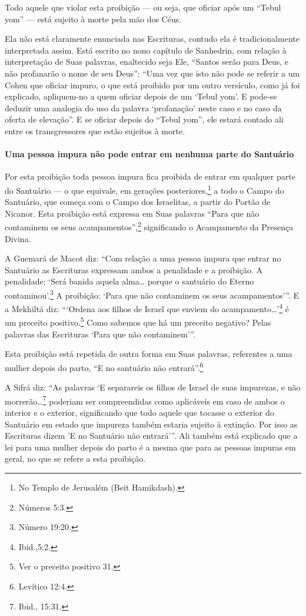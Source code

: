 Todo aquele que violar esta proibição --- ou seja, que oficiar após um
``Tebul yom'' --- está sujeito à morte pela mão dos Céus.

Ela não está claramente enunciada nas Escrituras, contudo ela é
tradicionalmente interpretada assim. Está escrito no nono capítulo de
Sanhedrin, com relação à interpretação de Suas palavras, enaltecido seja
Ele, ``Santos serão para Deus, e não profanarão o nome de seu Deus'': ``Uma vez que isto não
pode se referir a um Cohen que oficiar impuro, o que está proibido
por um outro versículo, como já foi explicado, apliquem-no a quem
oficiar depois de um `Tebul yom'. E pode-se deduzir uma analogia do uso
da palavra `profanação' neste caso e no caso da oferta de elevação''. E
se oficiar depois do ``Tebul yom'', ele estará contado ali entre os
transgressores que estão sujeitos à morte.

\paragraph{Uma pessoa impura não pode entrar em nenhuma parte do Santuário}

Por esta proibição toda pessoa impura fica proibida de entrar em
qualquer parte do Santuário --- o que equivale, em gerações
posteriores,\footnote{No Templo de Jerusalém (Beit Hamikdash).} a todo o Campo do Santuário, que
começa com o Campo dos Israelitas, a partir do Portão de Nicanor. Esta
proibição está expressa em Suas palavras ``Para que não contaminem os
seus acampamentos'',\footnote{Números 5:3.} significando o Acampamento da
Presença Divina.

A Guemará de Macot diz: ``Com relação a uma pessoa impura que entrar no
Santuário as Escrituras expressam ambos a penalidade e a proibição. A
penalidade: `Será banida aquela alma\ldots{} porque o santuário do Eterno
contaminou'.\footnote{Número 19:20.} A proibição: `Para que não contaminem os
seus acampamentos'''. E a Mekhiltá diz: ```Ordena aos filhos de Israel
que enviem do acampamento\ldots{}'\footnote{Ibid.,5:2.} é um preceito
positivo.\footnote{Ver o preceito positivo 31.} Como sabemos que há um preceito
negativo? Pelas palavras das Escrituras `Para que não contaminem'''.

Esta proibição está repetida de outra forma em Suas palavras, referentes
a uma mulher depois do parto, ``E no santuário não entrará''.\footnote{Levítico
12:4.}

A Sifrá diz: ``As palavras `E separareis os filhos de Israel de suas
impurezas, e não morrerão\ldots{}\footnote{Ibid., 15:31.} poderiam ser compreendidas
como aplicáveis em caso de ambos o interior e o exterior, significando
que todo aquele que tocasse o exterior do Santuário em estado que
impureza também estaria sujeito à extinção. Por isso as Escrituras dizem
'E no Santuário não entrará'''. Ali também está explicado que a lei para
uma mulher depois do parto é a mesma que para as pessoas impuras em
geral, no que se refere a esta proibição.

